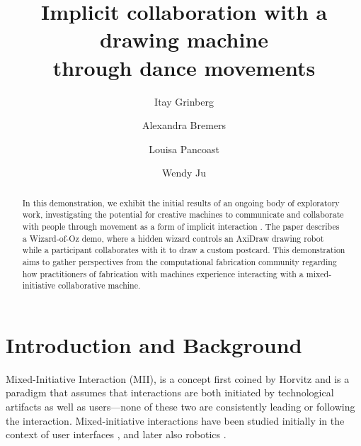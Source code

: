 \documentclass[sigconf,anonymous=false]{acmart}
\begin{document}
\title{Implicit collaboration with a drawing machine \\through dance movements}

\author{Itay Grinberg}

\author{Alexandra Bremers}

\author{Louisa Pancoast}

\author{Wendy Ju}


\renewcommand{\shortauthors}{Grinberg, et al.}

\begin{abstract}
In this demonstration, we exhibit the initial results of an ongoing body of exploratory work, investigating the potential for creative machines to communicate and collaborate with people through movement as a form of implicit interaction \cite{ju_design_2015}. The paper describes a Wizard-of-Oz demo, where a hidden wizard controls an AxiDraw drawing robot while a participant collaborates with it to draw a custom postcard. This demonstration aims to gather perspectives from the computational fabrication community regarding how practitioners of fabrication with machines experience interacting with a mixed-initiative collaborative machine. 
\end{abstract}



\maketitle

\section{Introduction and Background}

Mixed-Initiative Interaction (MII), is a concept first coined by Horvitz \cite{horvitz_principles_1999} and is a paradigm that assumes that interactions are both initiated by technological artifacts as well as users---none of these two are consistently leading or following the interaction. Mixed-initiative interactions have been studied initially in the context of user interfaces \cite{horvitz_principles_1999}, and later also robotics \cite{jiang2015mixed}. 
\end{document}
